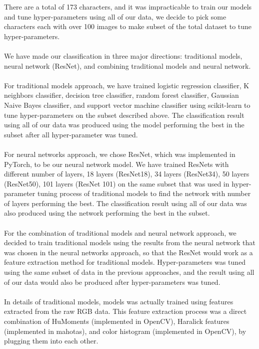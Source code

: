 \documentclass[11.5pt]{article}
\begin{document}
There are a total of 173 characters, and it was impracticable to train our models and tune hyper-parameters using all of our data, we decide to pick some characters each with over 100 images to make subset of the total dataset to tune hyper-parameters.\\ \\
We have made our classification in three major directions: traditional models, neural network (ResNet), and combining traditional models and neural network.\\ \\
For traditional models approach, we have trained logistic regression classifier, K neighbors classifier, decision tree classifier, random forest classifier, Gaussian Naive Bayes classifier, and support vector machine classifier using scikit-learn to tune hyper-parameters on the subset described above.
The classification result using all of our data was produced using the model performing the best in the subset after all hyper-parameter was tuned.\\ \\
For neural networks approach, we chose ResNet, which was implemented in PyTorch, to be our neural network model.
We have trained ResNets with different number of layers, 18 layers (ResNet18), 34 layers (ResNet34), 50 layers (ResNet50), 101 layers (ResNet 101) on the same subset that was used in hyper-parameter tuning process of traditional models to find the network with number of layers performing the best.
The classification result using all of our data was also produced using the network performing the best in the subset.\\ \\
For the combination of traditional models and neural network approach, we decided to train traditional models using the results from the neural network that was chosen in the neural networks approach, so that the ResNet would work as a feature extraction method for traditional models.
Hyper-parameters was tuned using the same subset of data in the previous approaches, and the result using all of our data would also be produced after hyper-parameters was tuned.\\ \\
In details of traditional models, models was actually trained using features extracted from the raw RGB data.
This feature extraction process was a direct combination of HuMoments (implemented in OpenCV), Haralick features (implemented in mahotas), and color histogram (implemented in OpenCV), by plugging them into each other.
\end{document}
